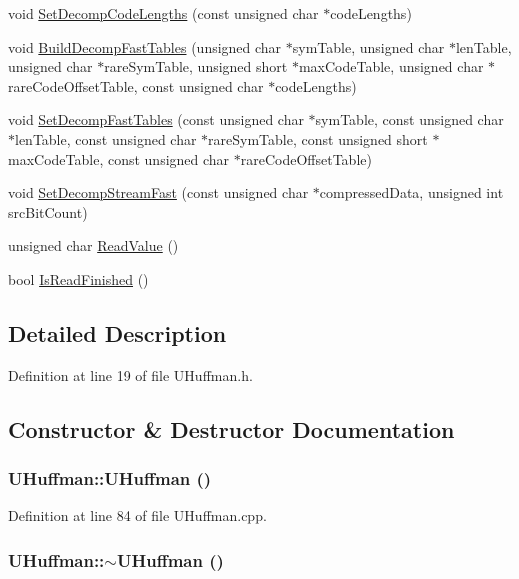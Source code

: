 \begin{CompactItemize}
void \hyperlink{class_u_huffman_96d45824c8002b45be38b9cf6ce36e02}{SetDecompCodeLengths} (const unsigned char $\ast$codeLengths)
\item 
void \hyperlink{class_u_huffman_bd37ac1f5c41a6e288d6068ad8e6bbf4}{BuildDecompFastTables} (unsigned char $\ast$symTable, unsigned char $\ast$lenTable, unsigned char $\ast$rareSymTable, unsigned short $\ast$maxCodeTable, unsigned char $\ast$rareCodeOffsetTable, const unsigned char $\ast$codeLengths)
\item 
void \hyperlink{class_u_huffman_3b8362f5138b30083836f777baa7e792}{SetDecompFastTables} (const unsigned char $\ast$symTable, const unsigned char $\ast$lenTable, const unsigned char $\ast$rareSymTable, const unsigned short $\ast$maxCodeTable, const unsigned char $\ast$rareCodeOffsetTable)
\item 
void \hyperlink{class_u_huffman_a6ec33a164afdf0b2dc7809a44603953}{SetDecompStreamFast} (const unsigned char $\ast$compressedData, unsigned int srcBitCount)
\item 
unsigned char \hyperlink{class_u_huffman_c7ca2b479e621b555778358d6b02aa11}{ReadValue} ()
\item 
bool \hyperlink{class_u_huffman_7286b963c43a2fa051e7a9956dc54e67}{IsReadFinished} ()
\end{CompactItemize}


\subsection{Detailed Description}


Definition at line 19 of file UHuffman.h.

\subsection{Constructor \& Destructor Documentation}
\hypertarget{class_u_huffman_1f62da0268315dfc2699b2998bfbdfd4}{
\subsubsection[{UHuffman}]{\setlength{\rightskip}{0pt plus 5cm}UHuffman::UHuffman ()}}
\label{class_u_huffman_1f62da0268315dfc2699b2998bfbdfd4}




Definition at line 84 of file UHuffman.cpp.\hypertarget{class_u_huffman_551d4efdc547d787e21ce00df8d9620b}{
\subsubsection[{$\sim$UHuffman}]{\setlength{\rightskip}{0pt plus 5cm}UHuffman::$\sim$UHuffman ()}}
\label{class_u_huffman_551d4efdc547d787e21ce00df8d9620b}





